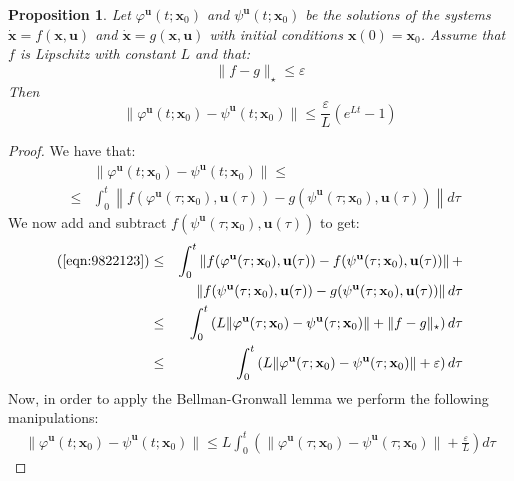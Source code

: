 \documentclass[a4paper,10pt,oneside]{book}
\newtheorem{proposition}[theorem]{Proposition}
\begin{document}
%
%
\begin{proposition}\label{prop:contWRTtheFlow}
 Let $\varphi^{\mathbf{u}}(t;\mathbf{x}_0)$ and $\psi^{\mathbf{u}}(t;\mathbf{x}_0)$ be the solutions of the systems $\dot{\mathbf{x}}=f(\mathbf{x},\mathbf{u})$ and $\dot{\mathbf{x}}=g(\mathbf{x},\mathbf{u})$ with initial conditions $\mathbf{x}(0)=\mathbf{x}_0$. Assume that $f$ is Lipschitz with constant $L$ and that:
\begin{equation}
 \|f-g\|_\star\leq \varepsilon
\end{equation}
Then
\begin{equation}
 \|\varphi^{\mathbf{u}}(t;\mathbf{x}_0)-\psi^{\mathbf{u}}(t;\mathbf{x}_0)\|\leq\frac{\varepsilon}{L}(e^{Lt}-1)
\end{equation}
\end{proposition}
\begin{proof}
 We have that:
\begin{eqnarray}
 &&\|\varphi^{\mathbf{u}}(t;\mathbf{x}_0)-\psi^{\mathbf{u}}(t;\mathbf{x}_0)\|\leq\nonumber\\
&\leq&
   \int_0^t \left\| f(\varphi^{\mathbf{u}}(\tau;\mathbf{x}_0),\mathbf{u}(\tau))-g(\psi^{\mathbf{u}}(\tau;\mathbf{x}_0),\mathbf{u}(\tau))\right\|d\tau  \label{eqn:9822123}
\end{eqnarray}
We now add and subtract $f(\psi^{\mathbf{u}}(\tau;\mathbf{x}_0),\mathbf{u}(\tau))$ to get:
\begin{eqnarray}
(\text{\ref{eqn:9822123}})&\leq&
   \int_0^t \left\| f(\varphi^{\mathbf{u}}(\tau;\mathbf{x}_0),\mathbf{u}(\tau))-f(\psi^{\mathbf{u}}(\tau;\mathbf{x}_0),\mathbf{u}(\tau))\right\|+\nonumber\\
&&\left\| f(\psi^{\mathbf{u}}(\tau;\mathbf{x}_0),\mathbf{u}(\tau))-g(\psi^{\mathbf{u}}(\tau;\mathbf{x}_0),\mathbf{u}(\tau))\right\|d\tau \\
&\leq& 
\int_0^t \left(L\|\varphi^{\mathbf{u}}(\tau;\mathbf{x}_0)-\psi^{\mathbf{u}}(\tau;\mathbf{x}_0)\|+\|f-g\|_\star\right) d\tau\\
&\leq& \int_0^t \left(L\|\varphi^{\mathbf{u}}(\tau;\mathbf{x}_0)-\psi^{\mathbf{u}}(\tau;\mathbf{x}_0)\|+\varepsilon\right) d\tau\label{eqn:662432}
\end{eqnarray}
Now, in order to apply the Bellman-Gronwall lemma we perform the following manipulations:
\begin{eqnarray}
\|\varphi^{\mathbf{u}}(t;\mathbf{x}_0)-\psi^{\mathbf{u}}(t;\mathbf{x}_0)\| \leq L\int_0^t \left(\|\varphi^{\mathbf{u}}(\tau;\mathbf{x}_0)-\psi^{\mathbf{u}}(\tau;\mathbf{x}_0)\|+\frac{\varepsilon}{L}\right) d\tau

\end{eqnarray}
\end{proof}
\end{document}

